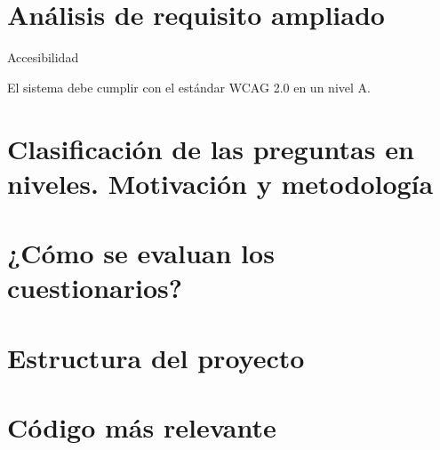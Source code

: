 \chapter{Análisis de requisito ampliado\label{apen:analisis de requisitos}}

\begin{rnf0}
	\item Accesibilidad
	\begin{rnf0*}
		\item El sistema debe cumplir con el estándar \acrshort{WCAG} 2.0 en un nivel A.
	\end{rnf0*}
\end{rnf0}

\chapter{Clasificación de las preguntas en niveles. Motivación y metodología\label{apend:preguntas en niveles}}

\chapter{¿Cómo se evaluan los cuestionarios?\label{apen:como se ponen las notas}}


\chapter{Estructura del proyecto\label{apen:estructura proyecto}}

\chapter{Código más relevante\label{apen:codigo}}


